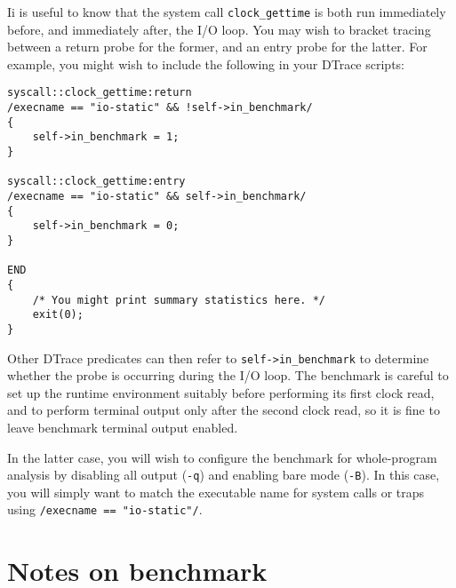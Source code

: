 \documentclass[a4paper,10pt]{article}
\newcommand{\code}[1]{\texttt{\small #1}}
\begin{document}
Ii is useful to know that the system call
\code{clock\_gettime} is both run immediately before, and immediately after,
the I/O loop.
You may wish to bracket tracing between a return probe for the former, and an
entry probe for the latter.
For example, you might wish to include the following in your DTrace scripts:

\begin{lstlisting}[basicstyle=\small\ttfamily]
syscall::clock_gettime:return
/execname == "io-static" && !self->in_benchmark/
{
    self->in_benchmark = 1;
}

syscall::clock_gettime:entry
/execname == "io-static" && self->in_benchmark/
{
    self->in_benchmark = 0;
}

END
{
    /* You might print summary statistics here. */
    exit(0);
}
\end{lstlisting}

\noindent
Other DTrace predicates can then refer to \code{self->in\_benchmark} to
determine whether the probe is occurring during the I/O loop.
The benchmark is careful to set up the runtime environment suitably before
performing its first clock read, and to perform terminal output only after the
second clock read, so it is fine to leave benchmark terminal output enabled.

In the latter case, you will wish to configure the benchmark for whole-program
analysis by disabling all output (\code{-q}) and enabling bare mode
(\code{-B}).
In this case, you will simply want to match the executable name for system
calls or traps using \code{/execname == "io-static"/}.



\section*{Notes on benchmark}
\end{document}
